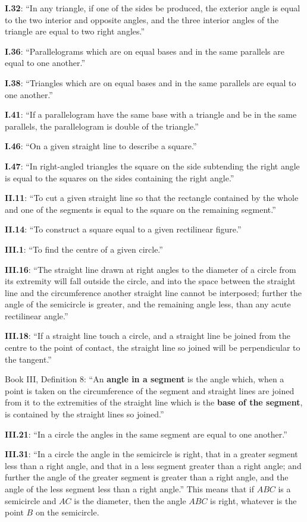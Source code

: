 \documentclass{article}
\begin{document}
\textbf{I.32}: ``In any triangle, if one of the sides be produced, the exterior angle is equal
to the two interior and opposite angles, and the
three interior angles of the triangle are equal to two right angles.''

\textbf{I.36}: ``Parallelograms which are on equal bases and in the same parallels are equal to one another.''

\textbf{I.38}: ``Triangles which are on equal bases and in the same parallels are equal to one another.''

\textbf{I.41}: ``If a parallelogram have the same base with a triangle and
be in the same parallels, the parallelogram is double of the
triangle.''

\textbf{I.46}: ``On a given straight line to describe a square.''

\textbf{I.47}: ``In right-angled triangles the square on the side subtending 
the right angle is equal to the squares on the sides containing
the right angle.''

\textbf{II.11}: ``To cut a given straight line so that the rectangle contained by 
the whole and one of the segments is equal to the square on the remaining segment.''

\textbf{II.14}: ``To construct a square equal to a given rectilinear figure.''

\textbf{III.1}: ``To find the centre of a given circle.''

\textbf{III.16}: ``The straight line drawn at right angles to the diameter
of a circle from its extremity will fall outside the circle, and
into the space between the straight line and the circumference
another straight line cannot be interposed; further the angle
of the semicircle is greater, and the remaining angle less, than
any acute rectilinear angle.''

\textbf{III.18}: ``If a straight line touch a circle, and a straight line be
joined from the centre to the point of contact, the straight line
so joined will be perpendicular to the tangent.''

Book III, Definition 8: ``An \textbf{angle in a segment} is the angle which, when
a point is taken on the circumference of the segment and
straight lines are joined from it to the extremities of the
straight line which is the \textbf{base of the segment}, is contained 
by the straight lines so joined.''

\textbf{III.21}: ``In a circle the angles in the same segment are equal to one another.'' 

\textbf{III.31}: ``In a circle the angle in the semicircle is right, that in a 
greater segment less than a right angle, and that in a less segment 
greater than a right angle; and further the angle of
the greater segment is greater than a right angle, and the angle
of the less segment less than a right angle.'' This means that if $ABC$ is a semicircle and $AC$ is the diameter,
then the angle $ABC$ is right, whatever is the point $B$ on the semicircle.
\end{document}
